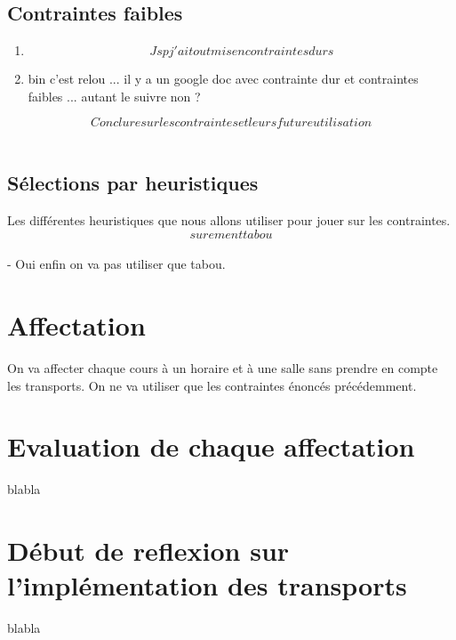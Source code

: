 \documentclass[a4paper,11pt]{article}
\begin{document}
	\subsection{Contraintes faibles}
		\begin{enumerate}
			\item $$Jsp j'ai tout mis en contraintes durs$$
			\item bin c'est relou ... il y a un google doc avec contrainte dur et contraintes faibles ... autant le suivre non ?
		\end{enumerate}
	$$Conclure sur les contraintes et leurs future utilisation$$\\
	\subsection{Sélections par heuristiques}
		Les différentes heuristiques que nous allons utiliser pour jouer sur les 
		contraintes. $$surement tabou$$ \\
		- Oui enfin on va pas utiliser que tabou. \\

\section{Affectation}
	On va affecter chaque cours à un horaire et à une salle sans prendre en compte les transports. On ne va utiliser que les contraintes énoncés précédemment. \\
	
\section{Evaluation de chaque affectation}
	blabla \\
	
\section{Début de reflexion sur l'implémentation des transports}
	blabla \\
\end{document}
